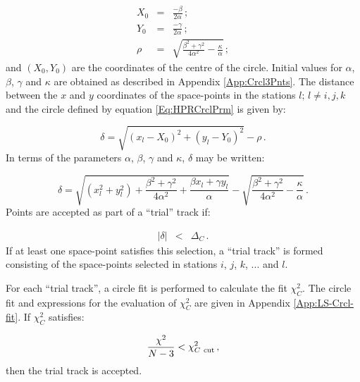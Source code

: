 \begin{eqnarray}
  X_0 & = & \frac{-\beta}{2 \alpha}                    \, ; \\
  Y_0 & = & \frac{-\gamma}{2 \alpha}                   \, ; \\
  \rho   & = & \sqrt{
                  \frac{\beta^2 + \gamma^2}{4 \alpha^2}
                  - \frac{\kappa}{\alpha}
                  } \, ;
\end{eqnarray}
and $(X_0, Y_0)$ are the coordinates of the centre of the circle. Initial values for $\alpha$, $\beta$, $\gamma$ and $\kappa$ are obtained as described in Appendix \ref{App:Crcl3Pnts}. The distance between the $x$ and $y$ coordinates of the space-points in the stations $l;\,l \ne i, j, k$ and the circle defined by equation \ref{Eq:HPRCrclPrm} is given by:

\begin{equation}
  \delta = \sqrt{(x_l-X_0)^2 + (y_l-Y_0)^2} - \rho \,.
\end{equation}
In terms of the parameters $\alpha$, $\beta$, $\gamma$ and $\kappa$, $\delta$ may be written:

\begin{equation}
  \delta = \sqrt{(x_l^2 + y_l^2)                       + 
                 \frac{\beta^2 + \gamma^2}{4 \alpha^2} +
                 \frac{\beta x_l + \gamma y_l}{\alpha}
           }                                            - 
           \sqrt{
                  \frac{\beta^2 + \gamma^2}{4 \alpha^2}
                  - \frac{\kappa}{\alpha}
                  }                                      \,.
\end{equation}
Points are accepted as part of a ``trial'' track if:

\begin{eqnarray}
  | \delta | & < & \Delta_C \, .
\end{eqnarray}
If at least one space-point satisfies this selection, a ``trial track'' is formed consisting of the space-points selected in stations $i$, $j$, $k$, ... and $l$.

For each ``trial track'', a circle fit is performed to calculate the fit $\chi_C^2$. The circle fit and expressions for the evaluation of $\chi^2_C$ are given in Appendix \ref{App:LS-Crcl-fit}. If $\chi^2_C$ satisfies:

\begin{equation}
  \frac{\chi^2}{N-3} < \chi^2_{C~{\rm cut}} \,,
\end{equation}
then the trial track is accepted.

